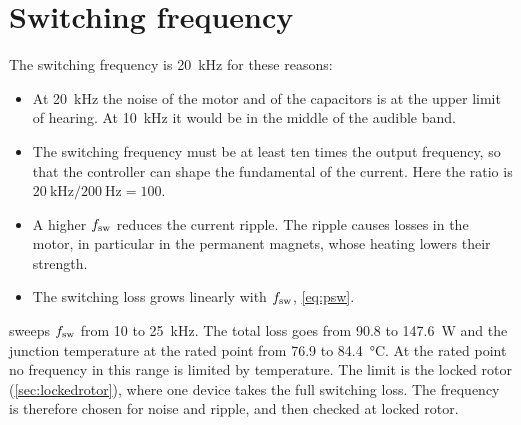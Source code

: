 \section{Switching frequency}

The switching frequency is \SI{20}{\kilo\hertz} for these reasons:
\begin{itemize}
  \item At \SI{20}{\kilo\hertz} the noise of the motor and of the capacitors
        is at the upper limit of hearing. At \SI{10}{\kilo\hertz} it would be
        in the middle of the audible band.
  \item The switching frequency must be at least ten times the output
        frequency, so that the controller can shape the fundamental of the
        current. Here the ratio is $\SI{20}{\kilo\hertz}/\SI{200}{\hertz} = 100$.
  \item A higher $f_{\mathrm{sw}}$ reduces the current ripple. The ripple causes
        losses in the motor, in particular in the permanent magnets, whose
        heating lowers their strength.
  \item The switching loss grows linearly with $f_{\mathrm{sw}}$, \cref{eq:psw}.
\end{itemize}

 sweeps $f_{\mathrm{sw}}$ from \SI{10}{} to \SI{25}{\kilo\hertz}. The
total loss goes from \SI{90.8}{} to \SI{147.6}{\watt} and the junction
temperature at the rated point from \SI{76.9}{} to \SI{84.4}{\celsius}. At
the rated point no frequency in this range is limited by temperature. The
limit is the locked rotor (\cref{sec:lockedrotor}), where one device takes
the full switching loss. The frequency is therefore chosen for noise and
ripple, and then checked at locked rotor.
